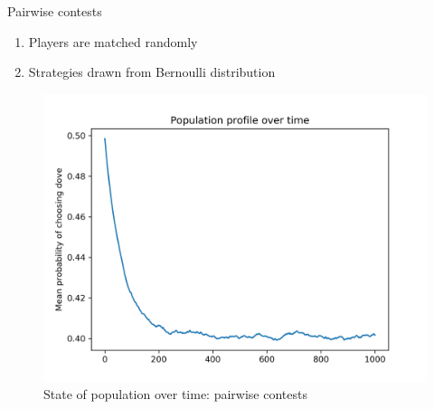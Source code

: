 \documentclass{IFES-beamer}
\begin{document}
        \begin{frame}{Pairwise contests}
        \begin{enumerate}
            \item Players are matched randomly
            \item Strategies drawn from Bernoulli distribution
        \end{enumerate}
            \begin{figure}[H]
                \centering
                \includegraphics[scale=0.4]{Images/multi_brain_pair.png}
                \caption{State of population over time: pairwise contests}
                \label{fig:GD}
            \end{figure}
        \end{frame}
        
\end{document}
